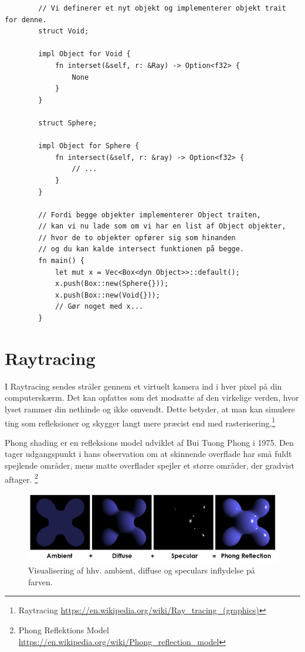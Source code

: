 \documentclass{article}
\begin{document}
\begin{flushleft}
\begin{verbatim}
        // Vi definerer et nyt objekt og implementerer objekt trait for denne.
        struct Void;

        impl Object for Void {
            fn interset(&self, r: &Ray) -> Option<f32> {
                None
            }
        }

        struct Sphere;

        impl Object for Sphere {
            fn intersect(&self, r: &ray) -> Option<f32> {
                // ...
            }
        }

        // Fordi begge objekter implementerer Object traiten,
        // kan vi nu lade som om vi har en list af Object objekter,
        // hvor de to objekter opfører sig som hinanden
        // og du kan kalde intersect funktionen på begge.
        fn main() {
            let mut x = Vec<Box<dyn Object>>::default();
            x.push(Box::new(Sphere{}));
            x.push(Box::new(Void{}));
            // Gør noget med x...
        }
    \end{verbatim}

    \section{Raytracing}

    I Raytracing sendes stråler gennem et virtuelt kamera ind i hver pixel på din computerskærm.
    Det kan opfattes som det modsatte af den virkelige verden, hvor lyset rammer din nethinde og ikke omvendt.
    Dette betyder, at man kan simulere ting som refleksioner
    og skygger langt mere præcist end med rasterisering.\footnote{Raytracing \url{https://en.wikipedia.org/wiki/Ray_tracing_(graphics)}}

    Phong shading er en refleksions model udviklet af Bui Tuong Phong i 1975.
    Den tager udgangspunkt i hans observation om at skinnende overflade har små fuldt spejlende områder,
    mens matte overflader spejler et større områder, der gradvist aftager.
    \footnote{Phong Reflektions Model \url{https://en.wikipedia.org/wiki/Phong_reflection_model}}

    \begin{figure}[H]
        \centering
        \includegraphics[scale=0.69]{./images/Phong_components_version_4.png}
        \caption{Visualisering af hhv. ambient, diffuse og speculars inflydelse på farven.}
    \end{figure}


\end{flushleft}
\end{document}
